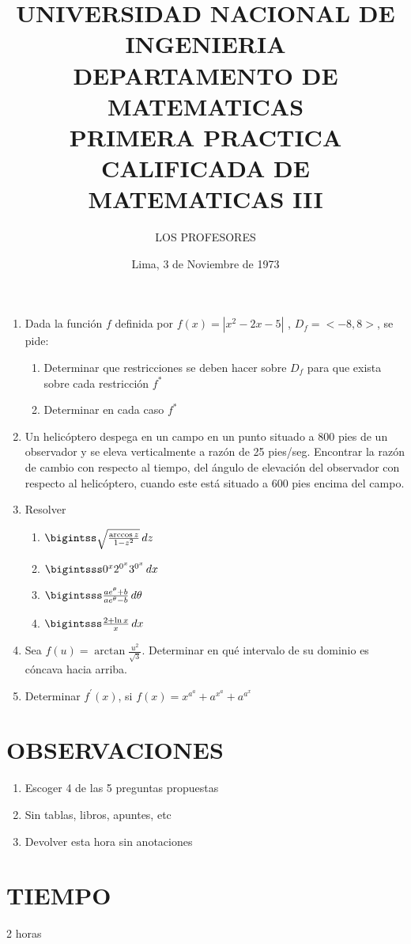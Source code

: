 \documentclass{exam}%
\title{UNIVERSIDAD NACIONAL DE INGENIERIA \\ DEPARTAMENTO DE MATEMATICAS \\ \large PRIMERA PRACTICA CALIFICADA DE MATEMATICAS III}
\author{LOS PROFESORES}
\date{Lima, 3 de Noviembre de 1973}
\begin{document}
\maketitle
\begin{enumerate}
	\item Dada la función $f$ definida por $f(x)=|x^2-2x-5|$ , $D_f=<-8,8>$, se pide:
		\begin{enumerate}[label=\alph*)]
			\item Determinar que restricciones se deben hacer sobre $D_f$ para que exista sobre cada restricción $f^*$
			\item Determinar en cada caso $f^*$
		\end{enumerate}
	\item Un helicóptero despega en un campo en un punto situado a 800 pies de un observador y se eleva verticalmente a razón de 25 pies/seg. Encontrar la razón de cambio con respecto al tiempo, del ángulo de elevación del observador con respecto al helicóptero, cuando este está situado a 600 pies encima del campo.
	\item Resolver
		\begin{enumerate}[label=\alph*)]
			\item $\bigintss\sqrt{\frac{\arccos{z}}{1-z^2}}\,dz$
			\item $\bigintsss 0^{x}2^{0^x}3^{0^x}\,dx$
			\item $\bigintsss\frac{ae^\theta+b}{ae^\theta-b}\,d\theta$
			\item $\bigintsss\frac{2+\ln{x}}{x}\,dx$
		\end{enumerate}
	\item Sea $f(u)=\arctan{\frac{u^2}{\sqrt{3}}}$. Determinar en qué intervalo de su dominio es cóncava hacia arriba.
	\item Determinar $f^\prime (x)$, si $f(x)=x^{a^a}+a^{x^a}+a^{a^x}$
\end{enumerate}
\section*{OBSERVACIONES}
\begin{enumerate}
	\item Escoger 4 de las 5 preguntas propuestas
	\item Sin tablas, libros, apuntes, etc
	\item Devolver esta hora sin anotaciones
\end{enumerate}
\section*{TIEMPO}		
	2 horas
\end{document}
